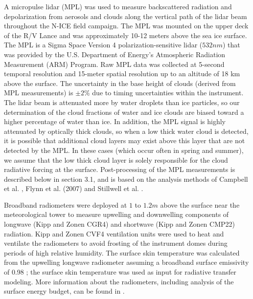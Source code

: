 A micropulse lidar (MPL) was used to measure backscattered radiation and depolarization from aerosols and clouds along the vertical path of the lidar beam throughout the N-ICE field campaign. The MPL was mounted on the upper deck of the R/V Lance and was approximately 10-12 meters above the sea ice surface. The MPL is a Sigma Space Version 4 polarization-sensitive lidar ($532 nm$) that was provided by the U.S. Department of Energy’s Atmospheric Radiation Measurement (ARM) Program. Raw MPL data was collected at 5-second temporal resolution and 15-meter spatial resolution up to an altitude of 18 km above the surface. The uncertainty in the base height of clouds (derived from MPL measurements) is $\pm 2 \%$ due to timing uncertainties within the instrument. The lidar beam is attenuated more by water droplets than ice particles, so our determination of the cloud fractions of water and ice clouds are biased toward a higher percentage of water than ice. In addition, the MPL signal is highly attenuated by optically thick clouds, so when a low thick water cloud is detected, it is possible that additional cloud layers may exist above this layer that are not detected by the MPL. In these cases (which occur often in spring and summer), we assume that the low thick cloud layer is solely responsible for the cloud radiative forcing at the surface. Post-processing of the MPL measurements is described below in section 3.1, and is based on the analysis methods of Campbell et al. \cite{campbell:2002}, Flynn et al. (2007) and Stillwell et al. \cite{stillwell:2018}.

Broadband radiometers were deployed at $1$ to $1.2 m$ above the surface near the meteorological tower to measure upwelling and downwelling components of longwave (Kipp and Zonen CGR4) and shortwave (Kipp and Zonen CMP22) radiation. Kipp and Zonen CVF4 ventilation units were used to heat and ventilate the radiometers to avoid frosting of the instrument domes during periods of high relative humidity. The surface skin temperature was calculated from the upwelling longwave radiometer assuming a broadband surface emissivity of 0.98 \cite{grenfell:1999}; the surface skin temperature was used as input for radiative transfer modeling. More information about the radiometers, including analysis of the surface energy budget, can be found in \cite{walden:2017}.

